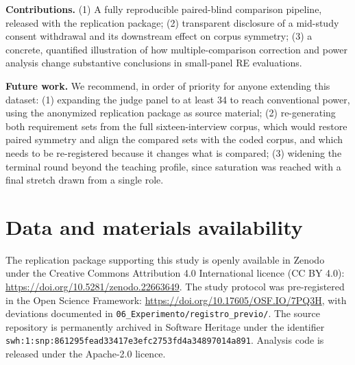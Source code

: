 \documentclass{llncs}
\begin{document}
\textbf{Contributions.} (1) A fully reproducible paired-blind comparison pipeline,
released with the replication package; (2) transparent disclosure of a mid-study
consent withdrawal and its downstream effect on corpus symmetry; (3) a concrete,
quantified illustration of how multiple-comparison correction and power analysis
change substantive conclusions in small-panel RE evaluations.

\textbf{Future work.} We recommend, in order of priority for anyone extending this
dataset: (1) expanding the judge panel to at least 34 to reach conventional power,
using the anonymized replication package as source material; (2) re-generating both
requirement sets from the full sixteen-interview corpus, which would restore paired
symmetry and align the compared sets with the coded corpus, and which needs to be
re-registered because it changes what is compared; (3) widening the terminal round beyond
the teaching profile, since saturation was reached with a final stretch drawn from a
single role.

\section*{Data and materials availability}
The replication package supporting this study is openly available in Zenodo under the
Creative Commons Attribution 4.0 International licence (CC BY 4.0):
\url{https://doi.org/10.5281/zenodo.22663649}. The study
protocol was pre-registered in the Open Science Framework:
\url{https://doi.org/10.17605/OSF.IO/7PQ3H}, with deviations documented in
\texttt{06\_Experimento/registro\_previo/}. The source
repository is permanently archived in Software Heritage under the identifier
\texttt{swh:1:snp:861295fead33417e3efc2753fd4a34897014a891}. Analysis code is released under the Apache-2.0 licence.

\end{document}
